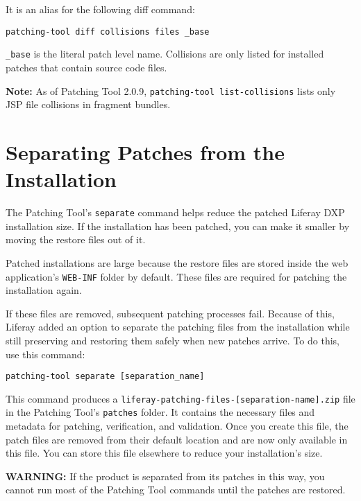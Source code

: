 It is an alias for the following diff command:

\begin{verbatim}
patching-tool diff collisions files _base
\end{verbatim}

\texttt{\_base} is the literal patch level name. Collisions are only
listed for installed patches that contain source code files.

\noindent\hrulefill

\textbf{Note:} As of Patching Tool 2.0.9,
\texttt{patching-tool\ list-collisions} lists only JSP file collisions
in fragment bundles.

\noindent\hrulefill

\section{Separating Patches from the
Installation}\label{separating-patches-from-the-installation}

The Patching Tool's \texttt{separate} command helps reduce the patched
Liferay DXP installation size. If the installation has been patched, you
can make it smaller by moving the restore files out of it.

Patched installations are large because the restore files are stored
inside the web application's \texttt{WEB-INF} folder by default. These
files are required for patching the installation again.

If these files are removed, subsequent patching processes fail. Because
of this, Liferay added an option to separate the patching files from the
installation while still preserving and restoring them safely when new
patches arrive. To do this, use this command:

\begin{verbatim}
patching-tool separate [separation_name] 
\end{verbatim}

This command produces a
\texttt{liferay-patching-files-{[}separation-name{]}.zip} file in the
Patching Tool's \texttt{patches} folder. It contains the necessary files
and metadata for patching, verification, and validation. Once you create
this file, the patch files are removed from their default location and
are now only available in this file. You can store this file elsewhere
to reduce your installation's size.

\textbf{WARNING:} If the product is separated from its patches in this
way, you cannot run most of the Patching Tool commands until the patches
are restored.

